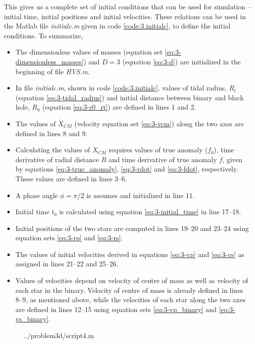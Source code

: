 \documentclass[a4paper]{article}
\begin{document}
\begin{enumerate} [label*=\textbf{(\alph*)}]
					This gives us a complete set of initial conditions that can be used for simulation -- initial time, initial positions and initial velocities. These relations can be used in the Matlab file \emph{initialc.m} given in code \ref{code:3.initialc}, to define the initial conditions. To summarize,
					\begin{itemize}
						\item The dimensionless values of masses (equation set \ref{eq:3-dimensionless_masses}) and \(D=3\) (equation \ref{eq:3-d}) are initialized in the beginning of file \emph{HVS.m}.
						\item In file \emph{initialc.m}, shown in code \ref{code:3.initialc}, values of tidal radius, \(R_t\) (equation \ref{eq:3-tidal_radius}) and initial distance between binary and black hole, \(R_0\) (equation \ref{eq:3-r0_rt}) are defined in lines 1 and 2.
						\item The values of \(\dot{X}_{CM}^{}\) (velocity equation set \ref{eq:3-vcm}) along the two axes are defined in lines 8 and 9.
						\item Calculating the values of \(\dot{X}_{CM}^{}\) requires values of true anomaly (\(f_0\)), time derivative of radial distance \(\dot{R}\) and time derivative of true anomaly \(\dot{f}\), given by equations \ref{eq:3-true_anomaly}, \ref{eq:3-rdot} and \ref{eq:3-fdot}, respectively. These values are defined in lines 3--6.
						\item A phase angle \(\phi = \pi/2\) is assumes and initialized in line 11.
						\item Initial time \(t_0\) is calculated using equation \ref{eq:3-initial_time} in line 17--18.
						\item Initial positions of the two stars are computed in lines 19--20 and 23--24 using equation sets \ref{eq:3-rp} and \ref{eq:3-rs}.
						\item The values of initial velocities derived in equations \ref{eq:3-vp} and \ref{eq:3-vs} as assigned in lines 21--22 and 25--26.
						\item Values of velocities depend on velocity of centre of mass as well as velocity of each star in the binary. Velocity of centre of mass is already defined in lines 8--9, as mentioned above, while the velocities of each star along the two axes are defined in lines 12--15 using equation sets \ref{eq:3-vp_binary} and \ref{eq:3-vs_binary}.
					\end{itemize}
					
					\begin{figure} [h]
						 {../problem3d/script4.m}
					\end{figure}
					

\end{enumerate}
\end{document}
